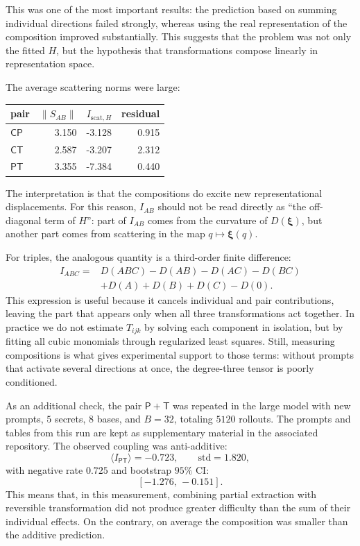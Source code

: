 \documentclass[10pt,twocolumn]{article}
\newcommand{\Ctrans}{\mathsf{C}}
\newcommand{\Ptrans}{\mathsf{P}}
\newcommand{\Ttrans}{\mathsf{T}}
\newcommand{\xrep}{\bm{\xi}}
\begin{document}
This was one of the most important results: the prediction based on summing individual directions failed strongly, whereas using the real representation of the composition improved substantially. This suggests that the problem was not only the fitted \(H\), but the hypothesis that transformations compose linearly in representation space.

The average scattering norms were large:
\begin{center}
\scriptsize
\begin{tabular}{@{}lrrr@{}}
\toprule
pair & \(\|S_{AB}\|\) & \(I_{\mathrm{scat},H}\) & residual \\
\midrule
\(\Ctrans\Ptrans\) & 3.150 & -3.128 & 0.915 \\
\(\Ctrans\Ttrans\) & 2.587 & -3.207 & 2.312 \\
\(\Ptrans\Ttrans\) & 3.355 & -7.384 & 0.440 \\
\bottomrule
\end{tabular}
\end{center}

The interpretation is that the compositions do excite new representational displacements. For this reason, \(I_{AB}\) should not be read directly as ``the off-diagonal term of \(H\)'': part of \(I_{AB}\) comes from the curvature of \(D(\xrep)\), but another part comes from scattering in the map \(q\mapsto\xrep(q)\).

For triples, the analogous quantity is a third-order finite difference:
\[
\begin{aligned}
I_{ABC}
={}&D(ABC)-D(AB)-D(AC)-D(BC)\\
&+D(A)+D(B)+D(C)-D(0).
\end{aligned}
\]
This expression is useful because it cancels individual and pair contributions, leaving the part that appears only when all three transformations act together. In practice we do not estimate \(T_{ijk}\) by solving each component in isolation, but by fitting all cubic monomials through regularized least squares. Still, measuring compositions is what gives experimental support to those terms: without prompts that activate several directions at once, the degree-three tensor is poorly conditioned.

As an additional check, the pair \(\Ptrans+\Ttrans\) was repeated in the large model with new prompts, \(5\) secrets, \(8\) bases, and \(B=32\), totaling \(5120\) rollouts. The prompts and tables from this run are kept as supplementary material in the associated repository. The observed coupling was anti-additive:
\[
\langle I_{\Ptrans\Ttrans}\rangle=-0.723,
\qquad
\mathrm{std}=1.820,
\]
with negative rate \(0.725\) and bootstrap \(95\%\) CI:
\[
[-1.276,\,-0.151].
\]
This means that, in this measurement, combining partial extraction with reversible transformation did not produce greater difficulty than the sum of their individual effects. On the contrary, on average the composition was smaller than the additive prediction.
\end{document}
